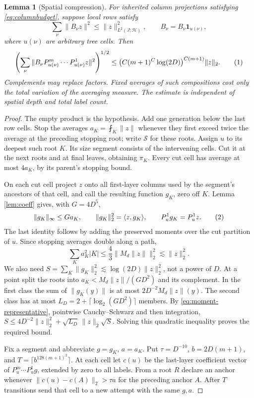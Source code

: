 \documentclass[11pt]{article}
\newtheorem{lemma}[theorem]{Lemma}
\theoremstyle{definition}
\newcommand{\one}{\mathbf 1}
\newcommand{\avint}{\fint}
\newcommand{\eqtag}[1]{\refstepcounter{equation}\tag{\theequation}\label{#1}}
\numberwithin{equation}{section}
\begin{document}
\begin{lemma}[Spatial compression]\label{lem:compression}
For inherited column projections satisfying \eqref{eq:columnbudget}, suppose local rows satisfy
\[
 \sum_\nu\|B_\nu z\|^2\le\|z\|_{L^2(J;\mathcal H)}^2,
 \qquad B_\nu=B_\nu\one_{u(\nu)},
\]
where $u(\nu)$ are arbitrary tree cells. Then
\[
 \left(\sum_\nu\|B_\nu P_{u(\nu)}^m\cdots P_{u(\nu)}^1z\|^2\right)^{1/2}
 \le\bigl(C(m+1)^C\log(2D)\bigr)^{C(m+1)}\|z\|_2.
 \eqtag{eq:compression}
\]
Complements may replace factors. Fixed averages of such compositions cost only the total variation of the averaging measure. The estimate is independent of spatial depth and total label count.
\end{lemma}
\begin{proof}
The empty product is the hypothesis. Add one generation below the last row cells. Stop the averages $a_K=\avint_K\|z\|$ whenever they first exceed twice the average at the preceding stopping root; write $\mathcal S$ for these roots. Assign $u$ to its deepest such root $K$. Its size segment consists of the intervening cells. Cut it at the next roots and at final leaves, obtaining $\pi_K$. Every cut cell has average at most $4a_K$, by its parent's stopping bound.

On each cut cell project $z$ onto all first-layer columns used by the segment's ancestors of that cell, and call the resulting function $g_K$, zero off $K$. Lemma \ref{lem:coeff} gives, with $G=4D^5$,
\[
 \|g_K\|_\infty\le Ga_K,\qquad \|g_K\|_2^2=\langle z,g_K\rangle,
 \qquad P_u^1g_K=P_u^1z.
 \eqtag{eq:moment-representative}
\]
The last identity follows by adding the preserved moments over the cut partition of $u$. Since stopping averages double along a path,
\[
 \sum_Ka_K^2|K|\le\frac43\|M_d\|z\|\|_2^2\lesssim\|z\|_2^2.
\]
We also need $S=\sum_K\|g_K\|_2^2\lesssim\log(2D)\|z\|_2^2$, not a power of $D$. At a point split the roots into $a_K<M_d\|z\|/(GD^2)$ and its complement. In the first class the sum of $\|g_K(y)\|$ is at most $2D^{-2}M_d\|z\|(y)$. The second class has at most $L_D=2+\lceil\log_2(GD^2)\rceil$ members. By \eqref{eq:moment-representative}, pointwise Cauchy--Schwarz and then integration, $S\le4D^{-2}\|z\|_2^2+\sqrt{L_D}\,\|z\|_2\sqrt S$. Solving this quadratic inequality proves the required bound.

Fix a segment and abbreviate $g=g_K$, $a=a_K$. Put $\tau=D^{-10}$, $b=2D(m+1)$, and $T=\lceil b^{128(m+1)^2}\rceil$. At each cell let $c(u)$ be the last-layer coefficient vector of $P_u^m\cdots P_u^1g$, extended by zero to all labels. From a root $R$ declare an anchor whenever $\|c(u)-c(A)\|_2>\tau a$ for the preceding anchor $A$. After $T$ transitions send that cell to a new attempt with the same $g,a$.


\end{proof}
\end{document}
